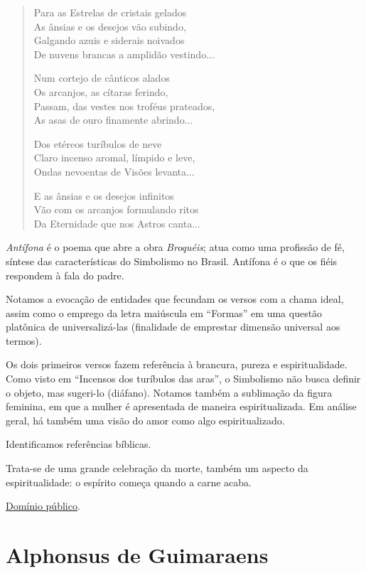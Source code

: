 \begin{verse}
 Para as Estrelas de cristais gelados \\
 As ânsias e os desejos vão subindo, \\
 Galgando azuis e siderais noivados \\
 De nuvens brancas a amplidão vestindo...

 Num cortejo de cânticos alados \\
 Os arcanjos, as cítaras ferindo, \\
 Passam, das vestes nos troféus prateados, \\
 As asas de ouro finamente abrindo...

 Dos etéreos turíbulos de neve \\
 Claro incenso aromal, límpido e leve, \\
 Ondas nevoentas de Visões levanta...

 E as ânsias e os desejos infinitos \\
 Vão com os arcanjos formulando ritos \\
 Da Eternidade que nos Astros canta... 
\end{verse}

\textit{Antífona} é o poema que abre a obra \textit{Broquéis}; atua como uma profissão de fé, síntese das características do Simbolismo no Brasil. Antífona é o que os fiéis respondem à fala do padre.

Notamos a evocação de entidades que fecundam os versos com a chama ideal, assim como o emprego da letra maiúscula em ``Formas'' em uma questão platônica de universalizá-las (finalidade de emprestar dimensão universal aos termos).

Os dois primeiros versos fazem referência à brancura, pureza e espiritualidade. Como visto em ``Incensos dos turíbulos das aras'', o Simbolismo não busca definir o objeto, mas sugeri-lo (diáfano). Notamos também a sublimação da figura feminina, em que a mulher é apresentada de maneira espiritualizada. Em análise geral, há também uma visão do amor como algo espiritualizado.

Identificamos referências bíblicas.

Trata-se de uma grande celebração da morte, também um aspecto da espiritualidade: o espírito começa quando a carne acaba.

\href{http://www.dominiopublico.gov.br/download/texto/bv000073.pdf}{Domínio público}.

\section{Alphonsus de Guimaraens}


